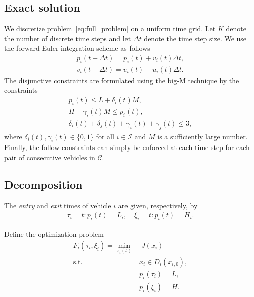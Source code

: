\documentclass{article}
\theoremstyle{definition}
\theoremstyle{plain}
\begin{document}
\subsection*{Exact solution}

We discretize problem~\eqref{eq:full_problem} on a uniform time grid.
Let $K$ denote the number of discrete time steps and let $\Delta t$ denote the time step size.
%
We use the forward Euler integration scheme as follows
\begin{subequations}
\begin{align}
  p_{i}(t + \Delta t) = p_{i}(t) + v_{i}(t) \Delta t , \\
  v_{i}(t + \Delta t) = v_{i}(t) + u_{i}(t) \Delta t .
\end{align}
\end{subequations}
The disjunctive constraints are formulated using the big-M technique by the constraints
\begin{subequations}
\begin{align}
  p_{i}(t) \leq L + \delta_{i}(t) M , \\
  H - \gamma_{i}(t) M \leq p_{i}(t) , \\
  \delta_{i}(t) + \delta_{j}(t) + \gamma_{i}(t) + \gamma_{j}(t) \leq 3 ,
\end{align}
\end{subequations}
where $\delta_{i}(t), \gamma_{i}(t) \in \{ 0, 1 \}$ for all $i \in \mathcal{I}$
and $M$ is a sufficiently large number.
%
Finally, the follow constraints can simply be enforced at each time step for
each pair of consecutive vehicles in $\mathcal{C}$.

\subsection*{Decomposition}

The \textit{entry} and \textit{exit} times of vehicle $i$ are given,
respectively, by
\begin{align}
  \tau_{i} = t : p_{i}(t) = L_{i} , \quad \xi_{i} = t : p_{i}(t) = H_{i} .
\end{align}

Define the optimization problem
\begin{subequations}
\begin{align}
  \label{eq:F_opt}
  F_{i}(\tau_{i}, \xi_{i}) = \min_{x_{i}(t)} & \; J(x_{i}) \\
                              \text{s.t. } & x_{i} \in D_{i}(x_{i,0}), \\
                                           & p_{i}(\tau_{i}) = L, \\
                                           & p_{i}(\xi_{i}) = H.
\end{align}
\end{subequations}
\end{document}
